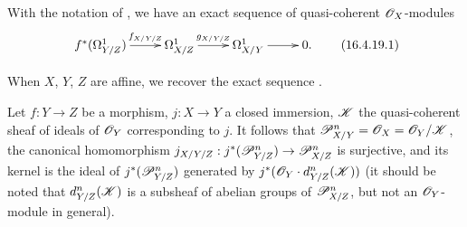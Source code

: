\begin{corollary}[16.4.19]
\label{IV.16.4.19}
With the notation of , we have an exact sequence of quasi-coherent $\mathscr{O}_X$-modules 
\[
  \label{IV.16.4.19.1}
  \xymatrix{
    f^*(\Omega_{Y/Z}^1) \ar[r]^-{f_{X/Y/Z}} & \Omega_{X/Z}^1 \ar[r]^-{g_{X/Y/Z}} & \Omega_{X/Y}^1 \ar[r] & 0.
  }
  \tag{16.4.19.1}
\]
\end{corollary}

When $X$, $Y$, $Z$ are affine, we recover the exact sequence .

\begin{proposition}[16.4.20]
\label{IV.16.4.20}
Let $f:Y \to Z$ be a morphism, $j: X \to Y$ a closed immersion, $\mathscr{K}$ the quasi-coherent sheaf of ideals of $\mathscr{O}_Y$ corresponding to $j$.
It follows that $\mathscr{P}_{X/Y}^n = \mathscr{O}_X = \mathscr{O}_Y/\mathscr{K}$, the canonical homomorphism $j_{X/Y/Z}: j^*(\sh{P}_{Y/Z}^n) \to \sh{P}_{X/Z}^n$ is surjective, and its kernel is the ideal of $j^*(\mathscr{P}_{Y/Z}^n)$ generated by $j^*(\mathscr{O}_Y \cdot d_{Y/Z}^n(\mathscr{K}))$ (it should be noted that $d_{Y/Z}^n(\mathscr{K})$ is a subsheaf of abelian groups of $\mathscr{P}_{X/Z}^n$, but not an $\mathscr{O}_Y$-module in general).
\end{proposition}

